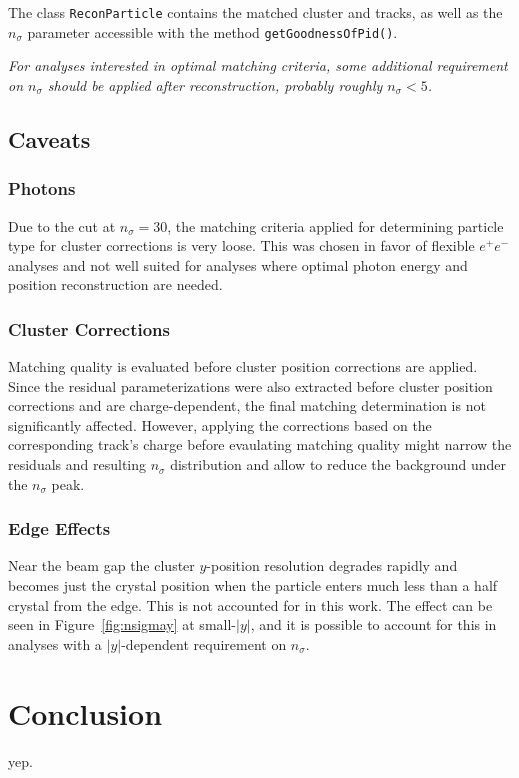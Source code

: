 \documentclass[amsmath,amssymb,notitlepage,12pt]{revtex4-1}
\begin{document}
The class \texttt{ReconParticle} contains the matched cluster and tracks, as well as the $n_\sigma$ parameter accessible with the method \texttt{getGoodnessOfPid()}. 

{\em For analyses interested in optimal matching criteria, some additional requirement on $n_\sigma$ should be applied after reconstruction, probably roughly $n_\sigma<5$.}

\subsection{Caveats}
\subsubsection{Photons}
Due to the cut at $n_\sigma=30$, the matching criteria applied for determining particle type for cluster corrections is very loose.  This was chosen in favor of flexible $e^+e^-$ analyses and not well suited for analyses where optimal photon energy and position reconstruction are needed.
\subsubsection{Cluster Corrections}
Matching quality is evaluated before cluster position corrections are applied.  Since the residual parameterizations were also extracted before cluster position corrections and are charge-dependent, the final matching determination is not significantly affected.  However, applying the corrections based on the corresponding track's charge before evaulating matching quality might narrow the residuals and resulting $n_\sigma$ distribution and allow to reduce the background under the $n_\sigma$ peak.
\subsubsection{Edge Effects}
Near the beam gap the cluster $y$-position resolution degrades rapidly and becomes just the crystal position when the particle enters much less than a half crystal from the edge.  This is not accounted for in this work.  The effect can be seen in Figure~\ref{fig:nsigmay} at small-$|y|$, and it is possible to account for this in analyses with a $|y|$-dependent requirement on $n_\sigma$.


\section{Conclusion}
yep.
\end{document}
